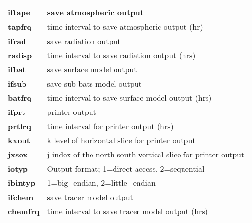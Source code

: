 \begin{table}[h]
\begin{center}
\begin{tabular}{|l|l|}
{\footnotesize {\bf iftape}} & {\footnotesize save atmospheric output} \\ \hline
\hspace{.3cm} {\footnotesize {\bf tapfrq}} & {\footnotesize time interval to save atmospheric output (hr)} \\ \hline
{\footnotesize {\bf ifrad}}  & {\footnotesize save radiation output } \\ \hline
\hspace{.3cm} {\footnotesize {\bf radisp}} & {\footnotesize time interval to save radiation output (hrs) } \\  \hline
{\footnotesize {\bf ifbat}}  & {\footnotesize save surface model output } \\  \hline
{\footnotesize {\bf ifsub}}  & {\footnotesize save sub-bats model output } \\  \hline
\hspace{.3cm} {\footnotesize {\bf batfrq}} & {\footnotesize time interval to save surface model output (hrs) }  \\ \hline
{\footnotesize {\bf ifprt}}  & {\footnotesize printer output} \\ \hline
\hspace{.3cm} {\footnotesize {\bf prtfrq}} & {\footnotesize time interval for printer output (hrs)} \\ \hline
\hspace{.3cm} {\footnotesize {\bf kxout}}  & {\footnotesize k level of horizontal slice for printer output} \\ \hline
\hspace{.3cm} {\footnotesize {\bf jxsex}}  & {\footnotesize j index of the north-south vertical slice for printer output} \\ \hline
{\footnotesize {\bf iotyp}}  & {\footnotesize Output format; 1=direct access, 2=sequential} \\ \hline
\hspace{.3cm} {\footnotesize {\bf ibintyp}}  & {\footnotesize 1=big\_endian, 2=little\_endian} \\ \hline
{\footnotesize {\bf ifchem}}  & {\footnotesize save tracer model output } \\ \hline
\hspace{.3cm} {\footnotesize {\bf chemfrq}} & {\footnotesize time interval to save tracer model output (hrs) } \\  \hline
\end{tabular}
\end{center}
\end{table}

